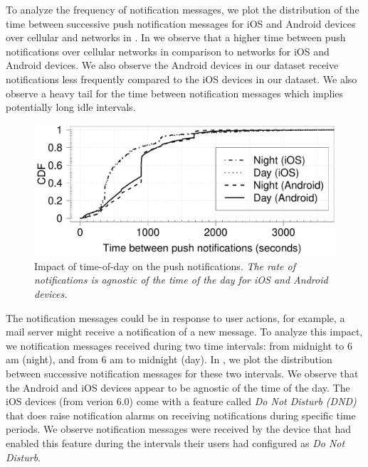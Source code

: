 To analyze the frequency of notification messages, we plot the distribution of the time between successive push notification messages for iOS and Android devices over cellular and \wifi networks in .
In  we observe that a higher time between push notifications over cellular networks in comparison to \wifi networks for iOS and Android devices.  
We also observe the Android devices in our dataset receive notifications less frequently compared to the iOS devices in our dataset. 
We also observe a heavy tail for the time between notification messages which implies potentially long idle intervals.


\begin{figure}
\centering
\includegraphics[width=\columnwidth]{plots/push_compare_diurnal_wild_distrib.pdf}
\caption{Impact of time-of-day on the push notifications. \emph{The rate of notifications is agnostic of the time of the day for iOS and Android devices.}}
\label{fig:push-wild-diurnal}
\end{figure}

The notification messages could be in response to user actions, for example, a mail server might receive a notification of a new message.
To analyze this impact, we notification messages received during two time intervals: from midnight to 6 am (night), and from 6 am to midnight (day). 
In , we plot the distribution between successive notification messages for these two intervals. 
We observe that the Android and iOS devices appear to be agnostic of the time of the day. 
The iOS devices (from verion 6.0) come with a feature called \emph{Do Not Disturb (DND)} that does raise notification alarms on receiving notifications during specific time periods. 
We observe notification messages were received by the device that had enabled this feature during the intervals their users had configured as \emph{Do Not Disturb}.


